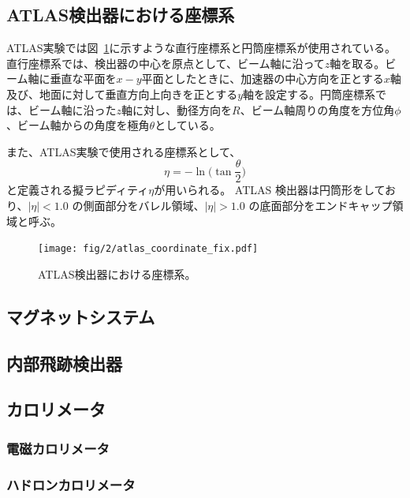 \subsection{ATLAS検出器における座標系}
ATLAS実験では図~\ref{fig:a}に示すような直行座標系と円筒座標系が使用されている。直行座標系では、検出器の中心を原点として、ビーム軸に沿って$z$軸を取る。ビーム軸に垂直な平面を$x-y$平面としたときに、加速器の中心方向を正とする$x$軸及び、地面に対して垂直方向上向きを正とする$y$軸を設定する。円筒座標系では、ビーム軸に沿った$z$軸に対し、動径方向を$R$、ビーム軸周りの角度を方位角$\phi$、ビーム軸からの角度を極角$\theta$としている。

また、ATLAS実験で使用される座標系として、
\begin{equation}
　\eta=-\ln\bigg(\tan\frac{\theta}{2}\bigg)
　\label{ラピディティ}
\end{equation}
と定義される擬ラピディティ$\eta$が用いられる。
ATLAS 検出器は円筒形をしており、$|\eta| < 1.0$ の側面部分をバレル領域、$|\eta| > 1.0$ の底面部分をエンドキャップ領域と呼ぶ。

\begin{figure}[tb]
  \centering
  \texttt{[image: fig/2/atlas\_coordinate\_fix.pdf]}
  \caption{ATLAS検出器における座標系。}
  \label{fig:a}
\end{figure}

\newpage
\subsection{マグネットシステム}\label{magnetic_filed}

\subsection{内部飛跡検出器}

\subsection{カロリメータ}

\subsubsection{電磁カロリメータ}

\subsubsection{ハドロンカロリメータ}

